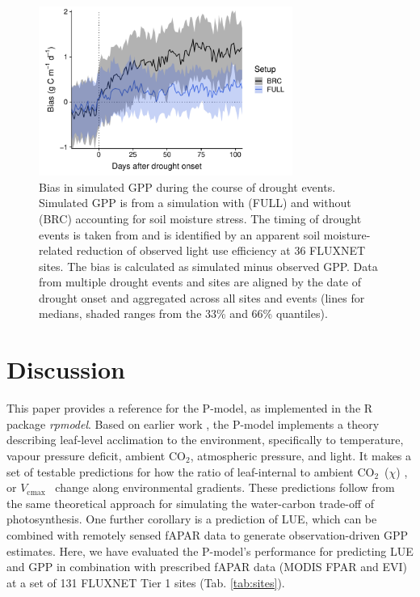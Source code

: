 \documentclass[gmd, manuscript]{copernicus}
\newcommand{\coo}{CO$_2$}
\newcommand{\vcmax}{$V_{\text{cmax}}$}
\begin{document}
\begin{figure}[t]
    \centering
\includegraphics[width=8.3cm]{fig/droughtresponse.pdf}
    \caption{Bias in simulated GPP during the course of drought events. Simulated GPP is from a simulation with (FULL) and without (BRC) accounting for soil moisture stress. The timing of drought events is taken from \citet{stocker18newphyt} and is identified by an apparent soil moisture-related reduction of observed light use efficiency at 36 FLUXNET sites. The bias is calculated as simulated minus observed GPP. Data from multiple drought events and sites are aligned by the date of drought onset and aggregated across all sites and events (lines for medians, shaded ranges from the 33\% and 66\% quantiles).}
    \label{fig:modobs_droughtresponse}
\end{figure}


\section{Discussion}
\label{sec:discussion}

This paper provides a reference for the P-model, as implemented in the R package \textit{rpmodel}. Based on earlier work \citep{wright03, prentice14ecollett, wang17natpl}, the P-model implements a theory describing leaf-level acclimation to the environment, specifically to temperature, vapour pressure deficit, ambient \coo , atmospheric pressure, and light. It makes a set of testable predictions for how the ratio of leaf-internal to ambient \coo\ ($\chi$) \citep{wang17natpl}, or \vcmax\ \citep{smith19ecollett} change along environmental gradients. These predictions follow from the same theoretical approach for simulating the water-carbon trade-off of photosynthesis. One further corollary is a prediction of LUE, which can be combined with remotely sensed fAPAR data to generate observation-driven GPP estimates. Here, we have evaluated the P-model's performance for predicting LUE and GPP in combination with prescribed fAPAR data (MODIS FPAR and EVI) at a set of 131 FLUXNET Tier 1 sites (Tab. \ref{tab:sites}).
\end{document}
